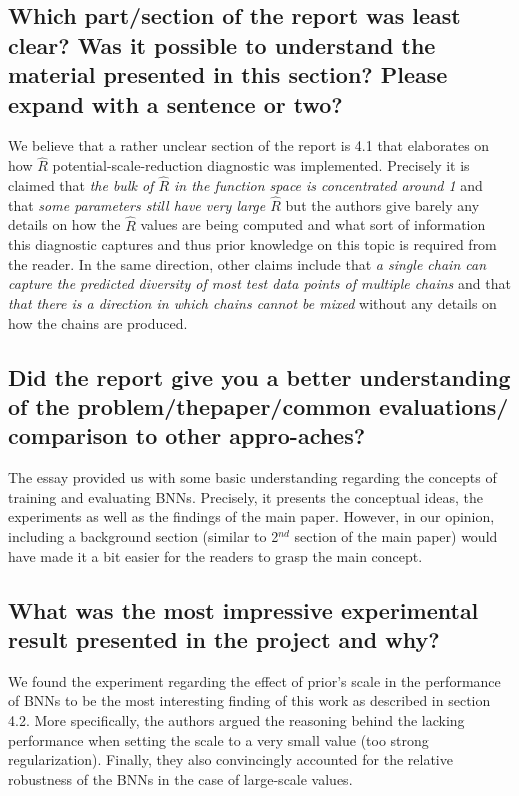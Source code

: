 \documentclass{article}
\begin{document}
\subsection{Which part/section of the report was least clear? Was it possible to
understand the material presented in this section? Please expand with
a sentence or two?}
We believe that a rather unclear section of the report is 4.1 that elaborates on how $\hat{R}$ potential-scale-reduction diagnostic was implemented. Precisely it is claimed that \textit{the bulk of $\hat{R}$ in the function space is concentrated around 1} and that \textit{some parameters still have very large $\hat{R}$} but the authors give barely any details on how the $\hat{R}$ values are being computed and what sort of information this diagnostic captures and thus prior knowledge on this topic is required from the reader. In the same direction, other claims include that \textit{a single chain can capture the predicted diversity of most test data points of multiple chains} and that \textit{that there is a direction in which chains cannot be mixed} without any details on how the chains are produced.

\subsection{Did the report give you a better understanding of the problem/thepaper/common evaluations/ comparison to other appro-aches?}
The essay provided us with some basic understanding regarding the concepts of training and evaluating BNNs. Precisely, it presents the conceptual ideas, the experiments as well as the findings of the main paper. However, in our opinion, including a background section (similar to 2$^{nd}$ section of the main paper) would have made it a bit easier for the readers to grasp the main concept.


\subsection{What was the most impressive experimental result presented in the
project and why?}
We found the experiment regarding the effect of prior’s scale in the performance of BNNs to be the most interesting finding of this work as described in section 4.2. More specifically, the authors argued the reasoning behind the lacking performance when setting the scale to a very small value (too strong regularization). Finally, they also convincingly accounted for the relative robustness of the BNNs in the case of large-scale values.
\end{document}
